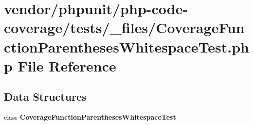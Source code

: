 \section{vendor/phpunit/php-\/code-\/coverage/tests/\+\_\+files/\+Coverage\+Function\+Parentheses\+Whitespace\+Test.php File Reference}
\label{php-code-coverage_2tests_2__files_2_coverage_function_parentheses_whitespace_test_8php}
\subsection*{Data Structures}
\begin{DoxyCompactItemize}
\item 
class {\bf Coverage\+Function\+Parentheses\+Whitespace\+Test}
\end{DoxyCompactItemize}

